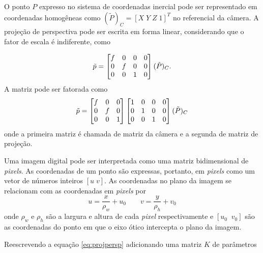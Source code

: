 O ponto ${P}$ expresso no sistema de coordenadas inercial pode ser representado em coordenadas homogêneas como $({\tilde{P}})_C = [X \; Y \; Z \; 1]^T$ no referencial da câmera. A projeção de perspectiva pode ser escrita em forma linear, considerando que o fator de escala é indiferente, como 

\begin{equation} \label{eq:projpersp}
\tilde{{p}} = \begin{bmatrix}
    f & 0 & 0 & 0 \\
    0 & f & 0 & 0 \\
    0 & 0 & 1 & 0
\end{bmatrix} (\tilde{{P}})_C.
\end{equation}
A matriz pode ser fatorada como %
\begin{equation}
\tilde{{p}} = \begin{bmatrix}
    f & 0 & 0 \\
    0 & f & 0 \\
    0 & 0 & 1 
\end{bmatrix} 
\begin{bmatrix}
    1 & 0 & 0 & 0 \\
    0 & 1 & 0 & 0 \\
    0 & 0 & 1 & 0
\end{bmatrix}(\tilde{{P}})_C
\end{equation}
onde a primeira matriz é chamada de matriz da câmera e a segunda de matriz de projeção.

Uma imagem digital pode ser interpretada como uma matriz bidimensional de \textit{pixels}. As coordenadas de um ponto são expressas, portanto, em \textit{pixels} como um vetor de números inteiros $[u\; v]$. As coordenadas no plano da imagem se relacionam com as coordenadas em \textit{pixels} por
\begin{equation}
u =  \frac{x}{\rho_w} + u_0 \qquad v = \frac{y}{\rho_h} + v_0
\end{equation}
onde $\rho_w$ e $\rho_h$ são a largura e altura de cada \textit{pixel} respectivamente e $[u_0\;\; v_0]$ são as coordenadas do ponto em que o eixo ótico intercepta o plano da imagem.

Reescrevendo a equação \eqref{eq:projpersp} adicionando uma matriz ${K}$ de parâmetros

